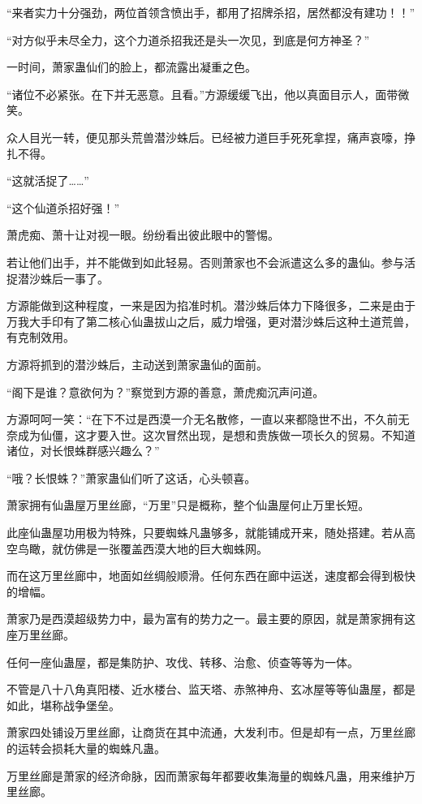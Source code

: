 \begin{this_body}
“来者实力十分强劲，两位首领含愤出手，都用了招牌杀招，居然都没有建功！！”

“对方似乎未尽全力，这个力道杀招我还是头一次见，到底是何方神圣？”

一时间，萧家蛊仙们的脸上，都流露出凝重之色。

“诸位不必紧张。在下并无恶意。且看。”方源缓缓飞出，他以真面目示人，面带微笑。

众人目光一转，便见那头荒兽潜沙蛛后。已经被力道巨手死死拿捏，痛声哀嚎，挣扎不得。

“这就活捉了……”

“这个仙道杀招好强！”

萧虎痴、萧十让对视一眼。纷纷看出彼此眼中的警惕。

若让他们出手，并不能做到如此轻易。否则萧家也不会派遣这么多的蛊仙。参与活捉潜沙蛛后一事了。

方源能做到这种程度，一来是因为掐准时机。潜沙蛛后体力下降很多，二来是由于万我大手印有了第二核心仙蛊拔山之后，威力增强，更对潜沙蛛后这种土道荒兽，有克制效用。

方源将抓到的潜沙蛛后，主动送到萧家蛊仙的面前。

“阁下是谁？意欲何为？”察觉到方源的善意，萧虎痴沉声问道。

方源呵呵一笑：“在下不过是西漠一介无名散修，一直以来都隐世不出，不久前无奈成为仙僵，这才要入世。这次冒然出现，是想和贵族做一项长久的贸易。不知道诸位，对长恨蛛群感兴趣么？”

“哦？长恨蛛？”萧家蛊仙们听了这话，心头顿喜。

萧家拥有仙蛊屋万里丝廊，“万里”只是概称，整个仙蛊屋何止万里长短。

此座仙蛊屋功用极为特殊，只要蜘蛛凡蛊够多，就能铺成开来，随处搭建。若从高空鸟瞰，就仿佛是一张覆盖西漠大地的巨大蜘蛛网。

而在这万里丝廊中，地面如丝绸般顺滑。任何东西在廊中运送，速度都会得到极快的增幅。

萧家乃是西漠超级势力中，最为富有的势力之一。最主要的原因，就是萧家拥有这座万里丝廊。

任何一座仙蛊屋，都是集防护、攻伐、转移、治愈、侦查等等为一体。

不管是八十八角真阳楼、近水楼台、监天塔、赤煞神舟、玄冰屋等等仙蛊屋，都是如此，堪称战争堡垒。

萧家四处铺设万里丝廊，让商货在其中流通，大发利市。但是却有一点，万里丝廊的运转会损耗大量的蜘蛛凡蛊。

万里丝廊是萧家的经济命脉，因而萧家每年都要收集海量的蜘蛛凡蛊，用来维护万里丝廊。


\end{this_body}

